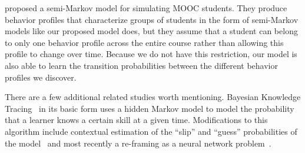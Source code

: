 \citet{Faucon:2016:EDM} proposed a semi-Markov model for simulating MOOC
students. They produce behavior profiles that characterize groups of
students in the form of semi-Markov models like our proposed model does,
but they assume that a student can belong to only one behavior profile
across the entire course rather than allowing this profile to change over
time. Because we do not have this restriction, our model is also able to
learn the transition probabilities between the different behavior profiles
we discover.

There are a few additional related studies worth mentioning.
Bayesian Knowledge Tracing~\cite{Corbett:1994:UMUAI} in its basic form uses
a hidden Markov model to model the probability that a learner knows a
certain skill at a given time. Modifications to this algorithm include
contextual estimation of the ``slip'' and ``guess'' probabilities of the
model~\cite{Baker:2008:ITS} and most recently a re-framing as a neural
network problem~\cite{Piech:2015:NIPS}.

